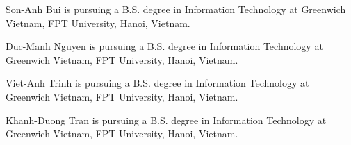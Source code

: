 \documentclass{ieeeaccess}
\begin{document}
\begin{IEEEbiography}{Son-Anh Bui} is pursuing a B.S. degree in Information Technology at Greenwich Vietnam, FPT University, Hanoi, Vietnam.
\end{IEEEbiography}

\begin{IEEEbiography}{Duc-Manh Nguyen} is pursuing a B.S. degree in Information Technology at Greenwich Vietnam, FPT University, Hanoi, Vietnam.
\end{IEEEbiography}

\begin{IEEEbiography}{Viet-Anh Trinh} is pursuing a B.S. degree in Information Technology at Greenwich Vietnam, FPT University, Hanoi, Vietnam.
\end{IEEEbiography}

\begin{IEEEbiography}{Khanh-Duong Tran} is pursuing a B.S. degree in Information Technology at Greenwich Vietnam, FPT University, Hanoi, Vietnam.
\end{IEEEbiography}

\EOD
\end{document}
